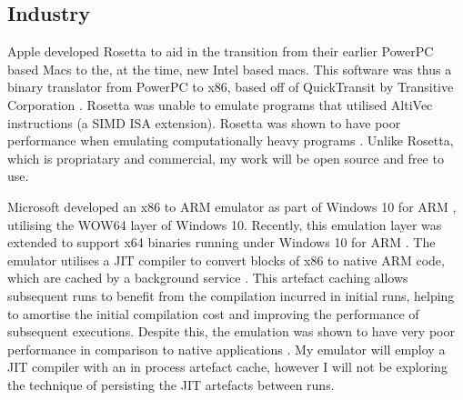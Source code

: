 \subsection{Industry}

Apple developed Rosetta \cite{apple-rosetta} to aid in the transition from their earlier PowerPC based Macs to the, at the time, new Intel based macs. This software was thus a binary translator from PowerPC to x86, based off of QuickTransit by Transitive Corporation \cite{cnet-rosetta}. Rosetta was unable to emulate programs that utilised AltiVec instructions (a SIMD ISA extension). Rosetta was shown to have poor performance when emulating computationally heavy programs \cite{rosetta-perf}. Unlike Rosetta, which is propriatary and commercial, my work will be open source and free to use.

Microsoft developed an x86 to ARM emulator as part of Windows 10 for ARM \cite{docs-win10-arm-emu}, utilising the WOW64 \cite{WOW64} layer of Windows 10. Recently, this emulation layer was extended to support x64 binaries running under Windows 10 for ARM \cite{win10-arm-x64-emu}. The emulator utilises a JIT compiler to convert blocks of x86 to native ARM code, which are cached by a background service \cite{docs-win10-arm-emu, blackberry-win10-arm-emu}. This artefact caching allows subsequent runs to benefit from the compilation incurred in initial runs, helping to amortise the initial compilation cost and improving the performance of subsequent executions. Despite this, the emulation was shown to have very poor performance in comparison to native applications \cite{win10-arm-x64-emu-perf1, win10-arm-x64-emu-perf2}. My emulator will employ a JIT compiler with an in process artefact cache, however I will not be exploring the technique of persisting the JIT artefacts between runs.


